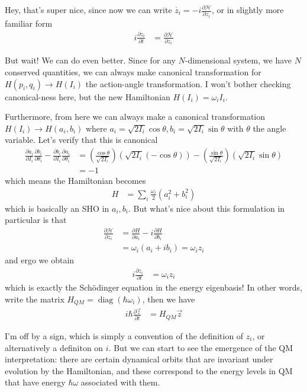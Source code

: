 \documentclass[10pt]{article}
\newcommand{\pd}[2]{\frac{\partial#1}{\partial#2}}
\DeclareMathOperator{\diag}{diag}
\begin{document}
Hey, that's super nice, since now we can write $\dot{z_i} =
-i\pd{\mathcal{H}}{z_i}$, or in slightly more familiar form
\begin{align}
    i\pd{z_i}{t} &= \pd{\mathcal{H}}{z_i}
\end{align}

But wait! We can do even better. Since for any $N$-dimensional system, we have
$N$ conserved quantities, we can always make canonical transformation for
$H(p_i, q_i) \to H(I_i)$ the action-angle transformation. I won't bother
checking canonical-ness here, but the new Hamiltonian $H(I_i) = \omega_iI_i$.

Furthermore, from here we can always make a canonical transformation $H(I_i) \to
H(a_i, b_i)$ where $a_i = \sqrt{2I_i}\cos\theta, b_i = \sqrt{2I_i}\sin\theta$
with $\theta$ the angle variable.  Let's verify that this is canonical
\begin{align}
    \pd{a_i}{I_i}\pd{b_i}{\theta_i} - \pd{b_i}{I_i}\pd{a_i}{\theta_i} &=
        \left( \frac{\cos\theta}{\sqrt{2I_i}} \right)
        \left( \sqrt{2I_i}(-\cos\theta) \right) -
        \left( \frac{\sin\theta}{\sqrt{2I_i}} \right)
        \left( \sqrt{2I_i}\sin\theta \right)\\
        &= -1
\end{align}
which means the Hamiltonian becomes
\begin{align}
    H &= \sum\limits_{i}^{}\frac{\omega_i}{2}(a_i^2 + b_i^2)
\end{align}
which is basically an SHO in $a_i, b_i$. But what's nice about this formulation
in particular is that
\begin{align}
    \pd{\mathcal{H}}{z_i} &= \pd{H}{a_i} - i\pd{H}{b_i}\\
    &= \omega_i(a_i + ib_i) = \omega_iz_i
\end{align}
and ergo we obtain
\begin{align}
    i\pd{z_i}{t} &= \omega_iz_i
\end{align}
which is exactly the Sch\"odinger equation in the energy eigenbasis! In other
words, write the matrix $H_{QM} = \diag(\hbar \omega_i)$, then we have
\begin{align}
    i\hbar \pd{\vec{z}}{t} &= H_{QM}\vec{z}\label{5.SE}
\end{align}

I'm off by a sign, which is simply a convention of the definition of $z_i$, or
alternatively a definiton on $i$. But we can start to see the emergence of the
QM interpretation: there are certain dynamical orbits that are invariant under
evolution by the Hamiltonian, and these correspond to the energy levels in QM
that have energy $\hbar \omega$ associated with them.
\end{document}
